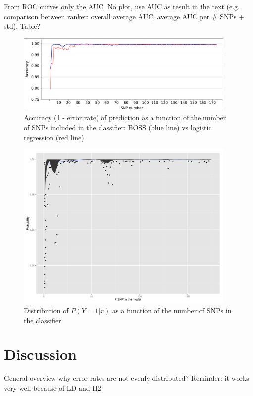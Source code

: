 From ROC curves only the AUC. No plot, use AUC as result in the text (e.g.
comparison between ranker: overall average AUC, average AUC per \# SNPs
+ std). Table?

\begin{figure}
\includegraphics[width=0.95\textwidth]{accuracy.pdf}
\caption{Accuracy (1 - error rate) of prediction as a function of the
  number of SNPs included in the classifier: BOSS (blue line) vs
  logistic regression (red line)}
\label{fig:accuracy}       %
\end{figure}

\begin{figure}
\includegraphics[width=0.95\textwidth]{probabilities.pdf}
\caption{Distribution of $P(Y=1|x)$ as a function of the number of SNPs
  in the classifier}
\label{fig:probability} 
\end{figure}


\section{Discussion}
\label{sec:discussion}
General overview
why error rates are not evenly distributed?
Reminder: it works very well because of LD and H2

